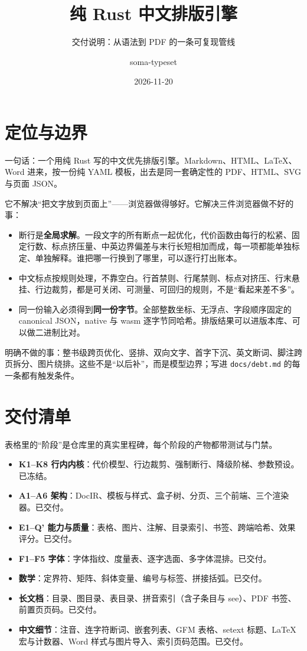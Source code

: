\documentclass{article}
\title{纯 Rust 中文排版引擎}
\subtitle{交付说明：从语法到 PDF 的一条可复现管线}
\author{soma-typeset}
\date{2026-11-20}
\begin{document}
\section{定位与边界}

一句话：一个用纯 Rust 写的中文优先排版引擎。Markdown、HTML、LaTeX、Word 进来，按一份纯 YAML 模板，出去是同一套确定性的 PDF、HTML、SVG 与页面 JSON。

它不解决“把文字放到页面上”——浏览器做得够好。它解决三件浏览器做不好的事：

\begin{itemize}
\item 断行是\textbf{全局求解}。一段文字的所有断点一起优化，代价函数由每行的松紧、固定行数、标点挤压量、中英边界偏差与末行长短相加而成，每一项都能单独标定、单独解释。谁把哪一行换到了哪里，可以逐行打出账本。
\item 中文标点按规则处理，不靠空白。行首禁则、行尾禁则、标点对挤压、行末悬挂、行边裁剪，都是可关闭、可测量、可回归的规则，不是“看起来差不多”。
\item 同一份输入必须得到\textbf{同一份字节}。全部整数坐标、无浮点、字段顺序固定的 canonical JSON，native 与 wasm 逐字节同哈希。排版结果可以进版本库、可以做二进制比对。
\end{itemize}

明确不做的事：整书级跨页优化、竖排、双向文字、首字下沉、英文断词、脚注跨页拆分、图片绕排。这些不是“以后补”，而是模型边界；写进 \texttt{docs/debt.md} 的每一条都有触发条件。

\section{交付清单}

表格里的“阶段”是仓库里的真实里程碑，每个阶段的产物都带测试与门禁。

\begin{itemize}
\item \textbf{K1–K8 行内内核}：代价模型、行边裁剪、强制断行、降级阶梯、参数预设。已冻结。
\item \textbf{A1–A6 架构}：DocIR、模板与样式、盒子树、分页、三个前端、三个渲染器。已交付。
\item \textbf{E1–Q' 能力与质量}：表格、图片、注解、目录索引、书签、跨端哈希、效果评分。已交付。
\item \textbf{F1–F5 字体}：字体指纹、度量表、逐字选面、多字体混排。已交付。
\item \textbf{数学}：定界符、矩阵、斜体变量、编号与标签、拼接括弧。已交付。
\item \textbf{长文档}：目录、图目录、表目录、拼音索引（含子条目与 see）、PDF 书签、前置页页码。已交付。
\item \textbf{中文细节}：注音、连字符断词、嵌套列表、GFM 表格、setext 标题、LaTeX 宏与计数器、Word 样式与图片导入、索引页码范围。已交付。
\end{itemize}
\end{document}
